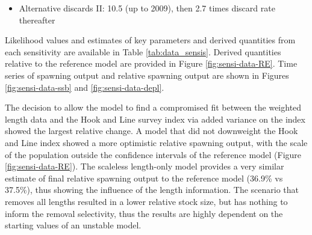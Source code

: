 \documentclass[11pt,
  english,
  a4paper,
]{article}
\begin{document}
\begin{enumerate}
\begin{itemize}
    \tagmcend\tagstructend\tagstructend
  \item


    Alternative discards II: 10.5 (up to 2009), then 2.7 times discard rate thereafter

    \tagmcend\tagstructend\tagstructend

    \tagmcend\tagstructend\tagstructend
  \end{itemize}

  \tagstructend
\end{enumerate}

\tagstructend


Likelihood values and estimates of key parameters and derived quantities from each sensitivity are available in Table \ref{tab:data_sensis}. Derived quantities relative to the reference model are provided in Figure \ref{fig:sensi-data-RE}. Time series of spawning output and relative spawning output are shown in Figures \ref{fig:sensi-data-ssb} and \ref{fig:sensi-data-depl}.

\leavevmode\tagmcend\tagstructend\par


The decision to allow the model to find a compromised fit between the weighted length data and the Hook and Line survey index via added variance on the index showed the largest relative change. A model that did not downweight the Hook and Line index showed a more optimistic relative spawning output, with the scale of the population outside the confidence intervals of the reference model (Figure \ref{fig:sensi-data-RE}). The scaleless length-only model provides a very similar estimate of final relative spawning output to the reference model (36.9\% vs 37.5\%), thus showing the influence of the length information. The scenario that removes all lengths resulted in a lower relative stock size, but has nothing to inform the removal selectivity, thus the results are highly dependent on the starting values of an unstable model.

\leavevmode\tagmcend\tagstructend\par

\end{document}
